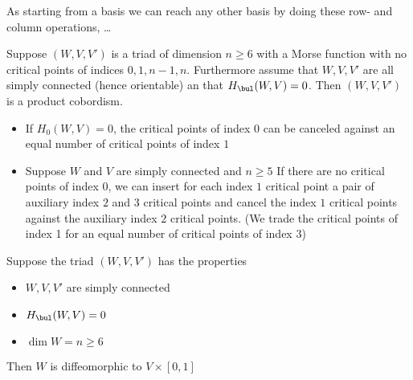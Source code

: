 As starting from a basis we can reach any other basis by doing these row- and column operations, \ldots {}

\begin{theorem}
    
\end{theorem}

\begin{theorem}[7.8]
    Suppose $(W, V, V')$ is a triad of dimension  $n\ge 6$ with a Morse function with no critical points of indices $0, 1, n-1, n$. Furthermore assume that  $W, V, V'$ are all simply connected (hence orientable) an that  $H_{\bul}(W, V) = 0$.
    Then $(W, V, V')$ is  a product cobordism.
\end{theorem}

\begin{theorem}[8.1]
    \begin{itemize}
        \item If $ H_0(W, V) = 0$, the critical points of index $0$ can be canceled against an equal number of critical points of index $1$
\item Suppose $W$ and  $V$ are simply connected and  $n \ge  5$
    If there are no critical points of index $0$, we can insert for each index  $1$ critical point a pair of auxiliary index  $2$ and  $3$ critical points and cancel the index  $1$ critical points against the auxiliary index  $2$ critical points. (We trade the critical points of index 1 for an equal number of critical points of index 3)
    \end{itemize}
\end{theorem}

\begin{theorem}
    Suppose the triad $(W, V, V')$ has the properties
     \begin{itemize}
        \item $W, V, V'$ are simply connected
        \item  $H_\bul(W, V) = 0$
        \item  $\dim W = n \ge  6$
    \end{itemize}
    Then $W$ is diffeomorphic to  $V \times [0,1]$
\end{theorem}
